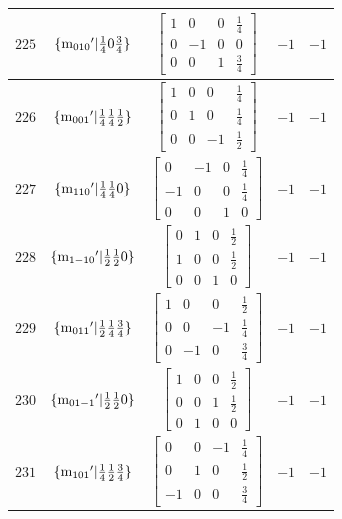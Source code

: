 \documentclass[fleqn,8pt]{jsarticle}
\begin{document}
\begin{longtable}{ccccc}
$ 225 $ & $ \{{\rm m}_{010}{}'|\frac{1}{4} 0 \frac{3}{4}\} $ & $ \begin{bmatrix} 1 & 0 & 0 & \frac{1}{4} \\ 0 & -1 & 0 & 0 \\ 0 & 0 & 1 & \frac{3}{4} \end{bmatrix} $ & $ -1 $ & $ -1 $ \\ \hline
$ 226 $ & $ \{{\rm m}_{001}{}'|\frac{1}{4} \frac{1}{4} \frac{1}{2}\} $ & $ \begin{bmatrix} 1 & 0 & 0 & \frac{1}{4} \\ 0 & 1 & 0 & \frac{1}{4} \\ 0 & 0 & -1 & \frac{1}{2} \end{bmatrix} $ & $ -1 $ & $ -1 $ \\ \hline
$ 227 $ & $ \{{\rm m}_{110}{}'|\frac{1}{4} \frac{1}{4} 0\} $ & $ \begin{bmatrix} 0 & -1 & 0 & \frac{1}{4} \\ -1 & 0 & 0 & \frac{1}{4} \\ 0 & 0 & 1 & 0 \end{bmatrix} $ & $ -1 $ & $ -1 $ \\ \hline
$ 228 $ & $ \{{\rm m}_{1-10}{}'|\frac{1}{2} \frac{1}{2} 0\} $ & $ \begin{bmatrix} 0 & 1 & 0 & \frac{1}{2} \\ 1 & 0 & 0 & \frac{1}{2} \\ 0 & 0 & 1 & 0 \end{bmatrix} $ & $ -1 $ & $ -1 $ \\ \hline
$ 229 $ & $ \{{\rm m}_{011}{}'|\frac{1}{2} \frac{1}{4} \frac{3}{4}\} $ & $ \begin{bmatrix} 1 & 0 & 0 & \frac{1}{2} \\ 0 & 0 & -1 & \frac{1}{4} \\ 0 & -1 & 0 & \frac{3}{4} \end{bmatrix} $ & $ -1 $ & $ -1 $ \\ \hline
$ 230 $ & $ \{{\rm m}_{01-1}{}'|\frac{1}{2} \frac{1}{2} 0\} $ & $ \begin{bmatrix} 1 & 0 & 0 & \frac{1}{2} \\ 0 & 0 & 1 & \frac{1}{2} \\ 0 & 1 & 0 & 0 \end{bmatrix} $ & $ -1 $ & $ -1 $ \\ \hline
$ 231 $ & $ \{{\rm m}_{101}{}'|\frac{1}{4} \frac{1}{2} \frac{3}{4}\} $ & $ \begin{bmatrix} 0 & 0 & -1 & \frac{1}{4} \\ 0 & 1 & 0 & \frac{1}{2} \\ -1 & 0 & 0 & \frac{3}{4} \end{bmatrix} $ & $ -1 $ & $ -1 $ \\ \hline

\end{longtable}
\end{document}
